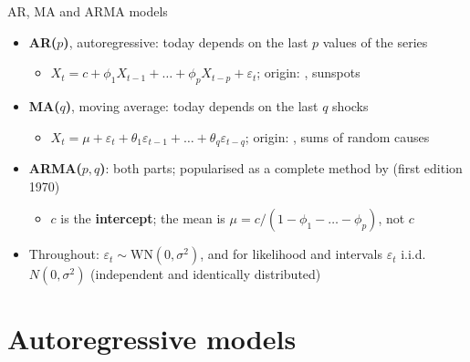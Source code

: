 \begin{frame}{AR, MA and ARMA models}
\itemsize{\small}
\begin{itemize}
    \item \textbf{AR($p$)}, autoregressive: today depends on the last $p$ values of the series
    \begin{itemize}
        \item $X_t = c + \phi_1X_{t-1} + \dots + \phi_pX_{t-p} + \varepsilon_t$; origin: , sunspots
    \end{itemize}
    \item \textbf{MA($q$)}, moving average: today depends on the last $q$ shocks
    \begin{itemize}
        \item $X_t = \mu + \varepsilon_t + \theta_1\varepsilon_{t-1} + \dots + \theta_q\varepsilon_{t-q}$; origin: , sums of random causes
    \end{itemize}
    \item \textbf{ARMA($p,q$)}: both parts; popularised as a complete method by  (first edition 1970)
    \begin{itemize}
        \item $c$ is the \textbf{intercept}; the mean is $\mu = c/(1 - \phi_1 - \dots - \phi_p)$, not $c$
    \end{itemize}
    \item Throughout: $\varepsilon_t \sim \mathrm{WN}(0, \sigma^2)$, and for likelihood and intervals $\varepsilon_t$ i.i.d. $N(0, \sigma^2)$ (independent and identically distributed)
\end{itemize}
\end{frame}


\section{Autoregressive models}

